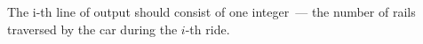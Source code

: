 The i-th line of output should consist of one integer~--- the number of rails traversed by the car during the $i$-th
ride.